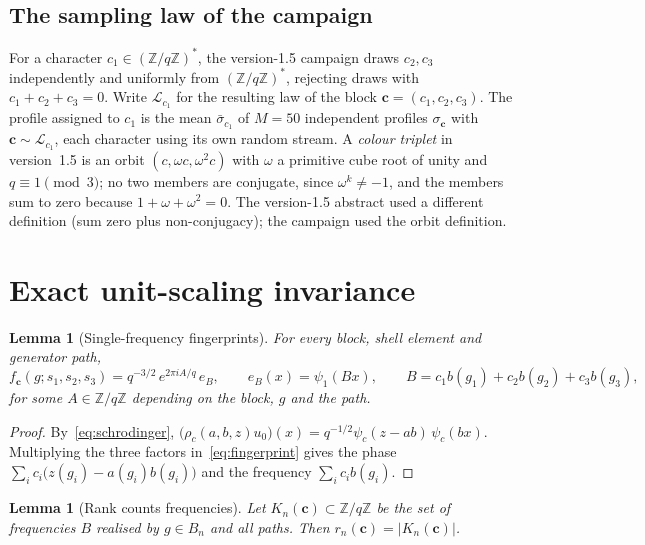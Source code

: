\documentclass[12pt,a4paper]{article}
\newtheorem{lemma}[theorem]{Lemma}
\theoremstyle{definition}
\theoremstyle{remark}
\newcommand{\Zq}{\mathbb{Z}/q\mathbb{Z}}
\newcommand{\Zqs}{(\mathbb{Z}/q\mathbb{Z})^{*}}
\begin{document}
  \subsection{The sampling law of the campaign}

    For a character $c_1\in\Zqs$, the version-1.5 campaign draws $c_2,c_3$ independently and
    uniformly from $\Zqs$, rejecting draws with $c_1+c_2+c_3=0$.
    Write $\mathcal L_{c_1}$ for the resulting law of the block $\mathbf c=(c_1,c_2,c_3)$.
    The profile assigned to $c_1$ is the mean $\bar\sigma_{c_1}$ of $M=50$ independent profiles
    $\sigma_{\mathbf c}$ with $\mathbf c\sim\mathcal L_{c_1}$, each character using its own
    random stream.
    A \emph{colour triplet} in version~1.5 is an orbit $(c,\omega c,\omega^2c)$ with $\omega$ a
    primitive cube root of unity and $q\equiv1\pmod3$; no two members are conjugate, since
    $\omega^k\neq-1$, and the members sum to zero because $1+\omega+\omega^2=0$.
    The version-1.5 abstract used a different definition (sum zero plus non-conjugacy); the
    campaign used the orbit definition.

  \section{Exact unit-scaling invariance}
  \label{sec:invariance}

  \begin{lemma}[Single-frequency fingerprints]
    \label{lem:single}
    For every block, shell element and generator path,
    \[
      f_{\mathbf c}(g;s_1,s_2,s_3)=q^{-3/2}\,e^{2\pi i A/q}\,e_B,
      \qquad e_B(x)=\psi_1(Bx),
      \qquad B=c_1b(g_1)+c_2b(g_2)+c_3b(g_3),
    \]
    for some $A\in\Zq$ depending on the block, $g$ and the path.
  \end{lemma}

  \begin{proof}
    By~\eqref{eq:schrodinger}, $\bigl(\rho_c(a,b,z)u_0\bigr)(x)=q^{-1/2}\psi_c(z-ab)\,\psi_c(bx)$.
    Multiplying the three factors in~\eqref{eq:fingerprint} gives the phase
    $\sum_i c_i\bigl(z(g_i)-a(g_i)b(g_i)\bigr)$ and the frequency $\sum_ic_ib(g_i)$.
  \end{proof}

  \begin{lemma}[Rank counts frequencies]
    \label{lem:count}
    Let $K_n(\mathbf c)\subset\Zq$ be the set of frequencies $B$ realised by $g\in B_n$ and all
    paths. Then $r_n(\mathbf c)=|K_n(\mathbf c)|$.
  \end{lemma}
\end{document}
